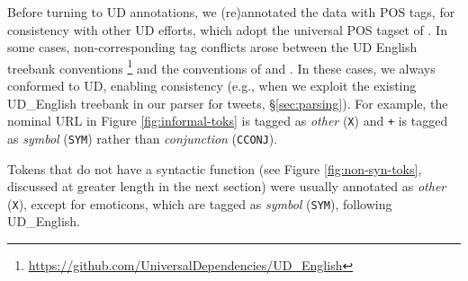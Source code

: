 \documentclass[11pt,a4paper]{article}
\newcommand{\heart}{\ensuremath\heartsuit}
\newcommand{\yjcomment}[1]{\textcolor{orange}{[$_\mathrm{L}^\mathrm{Y}$#1]}}
\newcommand{\yicomment}[1]{\textcolor{gray}{[#1 ---\textsc{yi}]}}
\begin{document}
Before turning to UD annotations, we (re)annotated the data with 
POS tags, for consistency with other UD efforts,
which adopt the universal POS tagset of .
In some cases,  non-corresponding tag conflicts arose between the UD English 
treebank conventions \cite[UD\_English;][]{Marneffe2014UniversalSD}\footnote{\url{https://github.com/UniversalDependencies/UD_English}}
and the conventions of  and
.  %
In these cases, we always
conformed to UD, enabling consistency (e.g., when we exploit the
existing UD\_English treebank in our parser for tweets, \S\ref{sec:parsing}).  For example,  
the nominal URL in Figure \ref{fig:informal-toks} is tagged as {\it
  other} ({\tt X}) and {\tt +} is tagged as {\it symbol} ({\tt SYM})
rather than {\it conjunction} ({\tt CCONJ}).  

Tokens that do not have a syntactic function (see Figure \ref{fig:non-syn-toks}, discussed at greater
length in the next section) were usually annotated as \emph{other}
(\texttt{X}), except for emoticons, which are tagged as \emph{symbol}
(\texttt{SYM}), following UD\_English.
\end{document}
